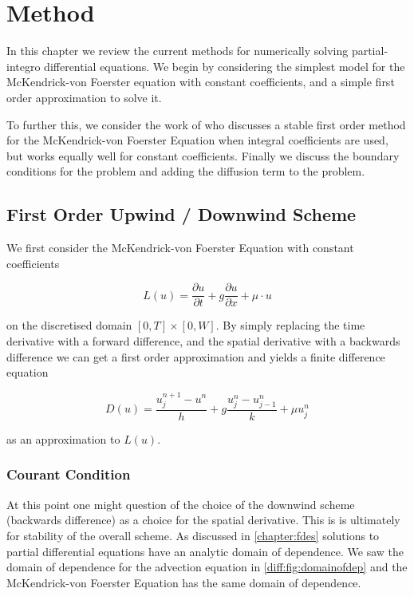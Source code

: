 \documentclass[../main.tex]{subfiles}
\begin{document}
  \chapter{Method}\label{chapter:method}

  In this chapter we review the current methods for numerically solving partial-integro differential equations. We begin by considering the simplest model for the McKendrick-von Foerster equation with constant coefficients, and a simple first order approximation to solve it.

  To further this, we consider the work of \cite{hartvig2011} who discusses a stable first order method for the McKendrick-von Foerster Equation when integral coefficients are used, but works equally well for constant coefficients. Finally we discuss the boundary conditions for the problem and adding the diffusion term to the problem.

  \section{First Order Upwind / Downwind Scheme}
  We first consider the McKendrick-von Foerster Equation with constant coefficients

  \begin{equation}
    L(u) = \frac{\partial u}{\partial t} + g \frac{\partial u}{\partial x} + \mu \cdot u
  \end{equation}

  on the discretised domain $[0, T] \times [0, W]$. By simply replacing the time derivative with a forward difference, and the spatial derivative with a backwards difference we can get a first order approximation and yields a finite difference equation

  \begin{equation}
    D(u) = \frac{u^{n+1}_j - u^n}{h} + g \frac{u^n_{j} - u^n_{j-1}}{k} + \mu u^n_j
  \end{equation}

  as an approximation to $L(u)$.

  \subsection{Courant Condition}
  At this point one might question of the choice of the downwind scheme (backwards difference) as a choice for the spatial derivative. This is is ultimately for stability of the overall scheme. As discussed in \autoref{chapter:fdes} solutions to partial differential equations have an analytic domain of dependence. We saw the domain of dependence for the advection equation in \autoref{diff:fig:domainofdep} and the McKendrick-von Foerster Equation has the same domain of dependence.
\end{document}
